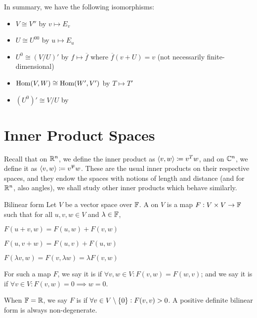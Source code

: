 \documentclass{styles/tufte}
\begin{document}
  In summary, we have the following isomorphisms:
  \begin{itemize}
    \item $V \cong V''$ by $v \mapsto E_v$
    \item $U \cong U^{00}$ by $u \mapsto E_u$
    \item $U^0 \cong (V/U)'$ by $f \mapsto \overline{f}$ where $\overline{f}(v + U) = v$ (not necessarily finite-dimensional)
    \item $\operatorname{Hom}(V, W) \cong \operatorname{Hom}(W', V')$ by $T \mapsto T'$
    \item $(U^0)' \cong V/U$ by
  \end{itemize}



\section{Inner Product Spaces}

Recall that on $\mathbb{R}^n$, we define the inner product as $\langle v, w \rangle \coloneqq v^T w$, and on $\mathbb{C}^n$, we define it as $\abrak{v, w} \defeq \overline{v}^T w$. These are the usual inner products on their respective spaces, and they endow the spaces with notions of length and distance (and for $\mathbb{R}^n$, also angles), we shall study other inner products which behave similarly.

\begin{definition}{Bilinear form}{}
  Let $V$ be a vector space over $\mathbb{F}$. A  on $V$ is a map $F: V \times V \to \mathbb{F}$ such that for all $u, v, w \in V$ and $\lambda \in \mathbb{F}$,
  \begin{romanenum}
    \item $F(u + v, w) = F(u, w) + F(v, w)$
    \item $F(u, v + w) = F(u, v) + F(u, w)$
    \item $F(\lambda v, w) = F(v, \lambda w) = \lambda F(v, w)$
  \end{romanenum}
  For such a map $F$, we say it is  if $\forall v, w \in V: F(v, w) = F(w, v)$; and we say it is  if $\forall v \in V: F(v, w) = 0 \implies w = 0$.
  
  When $\mathbb{F} = \mathbb{R}$, we say $F$ is  if $\forall v \in V \setminus \set{0}: F(v, v) > 0$. A positive definite bilinear form is always non-degenerate.
\end{definition}
\end{document}
